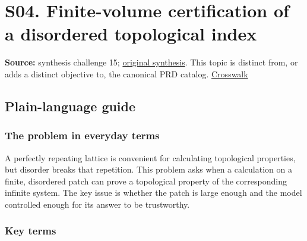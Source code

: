 \documentclass[
  11pt,
]{article}
\begin{document}
\section{S04. Finite-volume certification of a disordered topological
index}

\textbf{Source:} synthesis challenge 15;
\href{https://github.com/rick-stevens-ai/Pure-Thought/blob/main/NOTES/30-Most-Compelling-Pure-Thought-AI-Challenges.md}{original
synthesis}. This topic is distinct from, or adds a distinct objective
to, the canonical PRD catalog.
\href{https://github.com/rick-stevens-ai/Pure-Thought/blob/main/reviews/SYNTHESIS-CROSSWALK.md}{Crosswalk}

\subsection{Plain-language guide}

\subsubsection{The problem in everyday terms}

A perfectly repeating lattice is convenient for calculating topological
properties, but disorder breaks that repetition. This problem asks when
a calculation on a finite, disordered patch can prove a topological
property of the corresponding infinite system. The key issue is whether
the patch is large enough and the model controlled enough for its answer
to be trustworthy.

\subsubsection{Key terms}
\end{document}
